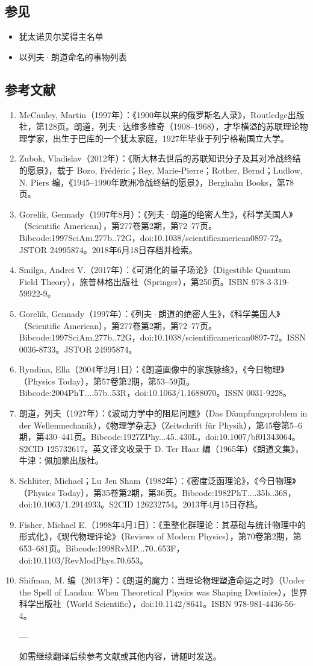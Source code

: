 \subsection{参见}
\begin{itemize}
\item 犹太诺贝尔奖得主名单
\item 以列夫·朗道命名的事物列表
\end{itemize}
\subsection{参考文献}
\begin{enumerate}
\item McCauley, Martin（1997年）：《1900年以来的俄罗斯名人录》，Routledge出版社，第128页。朗道，列夫·达维多维奇（1908–1968），才华横溢的苏联理论物理学家，出生于巴库的一个犹太家庭，1927年毕业于列宁格勒国立大学。
\item Zubok, Vladislav（2012年）：《斯大林去世后的苏联知识分子及其对冷战终结的愿景》，载于 Bozo, Frédéric；Rey, Marie-Pierre；Rother, Bernd；Ludlow, N. Piers 编，《1945–1990年欧洲冷战终结的愿景》，Berghahn Books，第78页。
\item Gorelik, Gennady（1997年8月）：《列夫·朗道的绝密人生》，《科学美国人》（Scientific American），第277卷第2期，第72–77页。Bibcode:1997SciAm.277b..72G，doi:10.1038/scientificamerican0897-72。JSTOR 24995874。2018年6月18日存档并检索。
\item Smilga, Andrei V.（2017年）：《可消化的量子场论》（Digestible Quantum Field Theory），施普林格出版社（Springer），第250页。ISBN 978-3-319-59922-9。
\item Gorelik, Gennady（1997年）：《列夫·朗道的绝密人生》，《科学美国人》（Scientific American），第277卷第2期，第72–77页。Bibcode:1997SciAm.277b..72G，doi:10.1038/scientificamerican0897-72。ISSN 0036-8733。JSTOR 24995874。
\item Ryndina, Ella（2004年2月1日）：《朗道画像中的家族脉络》，《今日物理》（Physics Today），第57卷第2期，第53–59页。Bibcode:2004PhT....57b..53R，doi:10.1063/1.1688070。ISSN 0031-9228。
\item 朗道，列夫（1927年）：《波动力学中的阻尼问题》（Das Dämpfungsproblem in der Wellenmechanik），《物理学杂志》（Zeitschrift für Physik），第45卷第5–6期，第430–441页。Bibcode:1927ZPhy...45..430L，doi:10.1007/bf01343064。S2CID 125732617。英文译文收录于 D. Ter Haar 编（1965年）《朗道文集》，牛津：佩加蒙出版社。
\item Schlüter, Michael；Lu Jeu Sham（1982年）：《密度泛函理论》，《今日物理》（Physics Today），第35卷第2期，第36页。Bibcode:1982PhT....35b..36S，doi:10.1063/1.2914933。S2CID 126232754。2013年4月15日存档。
\item Fisher, Michael E.（1998年4月1日）：《重整化群理论：其基础与统计物理中的形式化》，《现代物理评论》（Reviews of Modern Physics），第70卷第2期，第653–681页。Bibcode:1998RvMP...70..653F，doi:10.1103/RevModPhys.70.653。
\item Shifman, M. 编（2013年）：《朗道的魔力：当理论物理塑造命运之时》（Under the Spell of Landau: When Theoretical Physics was Shaping Destinies），世界科学出版社（World Scientific），doi:10.1142/8641。ISBN 978-981-4436-56-4。

---

如需继续翻译后续参考文献或其他内容，请随时发送。


\end{enumerate}